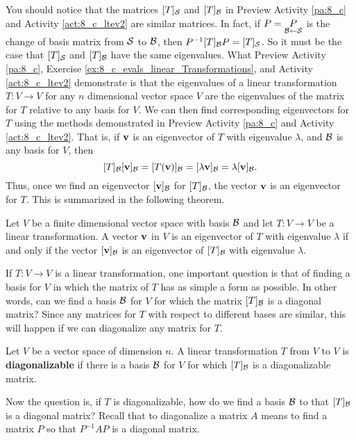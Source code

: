 You should notice that the matrices $[T]_{\mathcal{S}}$ and $[T]_{\mathcal{B}}$ in Preview Activity \ref{pa:8_c} and Activity \ref{act:8_c_ltev2} are similar matrices. In fact, if $P = \underset{\mathcal{B} \leftarrow \mathcal{S}}{P}$ is the change of basis matrix from $\mathcal{S}$ to $\mathcal{B}$, then $P^{-1}[T]_{\mathcal{B}}P = [T]_{\mathcal{S}}$. So it must be the case that $[T]_{\mathcal{S}}$ and $[T]_{\mathcal{B}}$ have the same eigenvalues. What Preview Activity \ref{pa:8_c}, Exercise \ref{ex:8_c_evals_linear_Transformations}, and Activity \ref{act:8_c_ltev2} demonstrate is that the eigenvalues of a linear transformation $T : V \to V$ for any $n$ dimensional vector space $V$ are the eigenvalues of the matrix for $T$ relative to any basis for $V$. We can then find corresponding eigenvectors for $T$ using the methods demonstrated in Preview Activity \ref{pa:8_c} and Activity \ref{act:8_c_ltev2}. That is, if $\mathbf{v}$ is an eigenvector of $T$ with eigenvalue $\lambda$, and $\mathcal{B}$ is any basis for $V$, then 
\[[T]_{\mathcal{B}}[\mathbf{v}]_{\mathcal{B}} = [T(\mathbf{v})]_{\mathcal{B}} = [\lambda \mathbf{v}]_{\mathcal{B}} = \lambda [\mathbf{v}]_{\mathcal{B}}.\]
Thus, once we find an eigenvector $[\mathbf{v}]_{\mathcal{B}}$ for $[T]_{\mathcal{B}}$, the vector $\mathbf{v}$ is an eigenvector for $T$. This is summarized in the following theorem.

\begin{theorem} Let $V$ be a finite dimensional vector space with basis $\mathcal{B}$ and let $T : V \to V$ be a linear transformation. A vector $\mathbf{v}$ in $V$ is an eigenvector of $T$ with eigenvalue $\lambda$ if and only if the vector $[\mathbf{v}]_{\mathcal{B}}$ is an eigenvector of $[T]_{\mathcal{B}}$ with eigenvalue $\lambda$. 
\end{theorem} 


\label{sec:diagonal}

If $T : V \to V$ is a linear transformation, one important question is that of finding a basis for $V$ in which the matrix of $T$ has as simple a form as possible. In other words, can we find a basis $\mathcal{B}$ for $V$ for which the matrix $[T]_{\mathcal{B}}$ is a diagonal matrix? Since any matrices for $T$ with respect to different bases are similar, this will happen if we can diagonalize any matrix for $T$. 

\begin{definition} Let $V$ be a vector space of dimension $n$. A linear transformation $T$ from $V$ to $V$ is \textbf{diagonalizable} if there is a basis $\mathcal{B}$ for $V$ for which $[T]_{\mathcal{B}}$ is a diagonalizable matrix. 
\end{definition}

Now the question is, if $T$ is diagonalizable, how do we find a basis $\mathcal{B}$ to that $[T]_{\mathcal{B}}$ is a diagonal matrix? Recall that to diagonalize a matrix $A$ means to find a matrix $P$ so that $P^{-1}AP$ is a diagonal matrix. 

